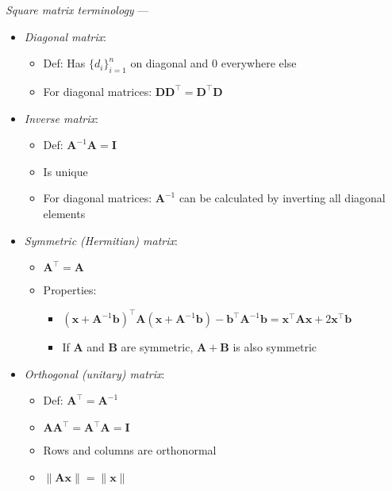 \emph{Square matrix terminology} ---
\begin{itemize}
    \item \emph{Diagonal matrix}:
    \begin{itemize}
        \item Def: Has $\{d_i\}_{i=1}^n$ on diagonal and 0 everywhere else
        \item For diagonal matrices: $\boldsymbol{D}\boldsymbol{D}^\intercal = \boldsymbol{D}^\intercal\boldsymbol{D}$
    \end{itemize} 
    \item \emph{Inverse matrix}:
    \begin{itemize}
        \item Def: $\boldsymbol{A}^{-1}\boldsymbol{A} = \boldsymbol{I}$
        \item Is unique
        \item For diagonal matrices: $\boldsymbol{A}^{-1}$ can be calculated by inverting all diagonal elements  
    \end{itemize} 
    \item \emph{Symmetric (Hermitian) matrix}:
    \begin{itemize}
        \item $\boldsymbol{A}^\intercal = \boldsymbol{A}$
        \item Properties:
        \begin{itemize}
            \item $( \boldsymbol{x} + \boldsymbol{A}^{-1} \boldsymbol{b} )^\intercal \boldsymbol{A} ( \boldsymbol{x} + \boldsymbol{A}^{-1} \boldsymbol{b} ) - \boldsymbol{b}^\intercal \boldsymbol{A}^{-1} \boldsymbol{b} = \boldsymbol{x}^\intercal \boldsymbol{A} \boldsymbol{x} + 2 \boldsymbol{x}^\intercal \boldsymbol{b}$
            \item If $\boldsymbol{A}$ and $\boldsymbol{B}$ are symmetric, $\boldsymbol{A} + \boldsymbol{B}$ is also symmetric
        \end{itemize}
    \end{itemize}
    \item \emph{Orthogonal (unitary) matrix}: 
    \begin{itemize}
        \item Def: $\boldsymbol{A}^\intercal = \boldsymbol{A}^{-1}$
        \item $\boldsymbol{A}\boldsymbol{A}^\intercal = \boldsymbol{A}^\intercal\boldsymbol{A} = \boldsymbol{I}$
        \item Rows and columns are orthonormal
        \item $\|\boldsymbol{A} \boldsymbol{x}\| = \|\boldsymbol{x}\|$

\end{itemize}
\end{itemize}
